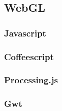 \documentclass[12pt]{article}
\begin{document}
\subsection{WebGL}

\subsubsection{Javascript}

\subsubsection{Coffeescript}

\subsubsection{Processing.js}

\subsubsection{Gwt}



\end{document}

